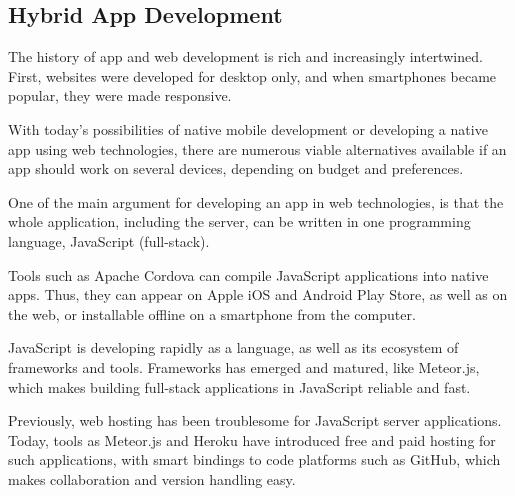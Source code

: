 \subsection{Hybrid App Development}

The history of app and web development is rich and increasingly intertwined. First, websites were developed for desktop only, and when smartphones became popular, they were made responsive.

With today's possibilities of native mobile development or developing a native app using web technologies, there are numerous viable alternatives available if an app should work on several devices, depending on budget and preferences.

One of the main argument for developing an app in web technologies, is that the whole application, including the server, can be written in one programming language, JavaScript (full-stack).

Tools such as Apache Cordova can compile JavaScript applications into native apps. Thus, they can appear on Apple iOS and Android Play Store, as well as on the web, or installable offline on a smartphone from the computer.

JavaScript is developing rapidly as a language, as well as its ecosystem of frameworks and tools. Frameworks has emerged and matured, like Meteor.js, which makes building full-stack applications in JavaScript reliable and fast.

Previously, web hosting has been troublesome for JavaScript server applications. Today, tools as Meteor.js and Heroku have introduced free and paid hosting for such applications, with smart bindings to code platforms such as GitHub, which makes collaboration and version handling easy.
